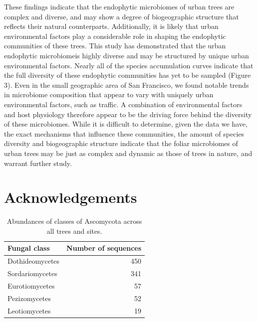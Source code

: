 \documentclass[fleqn,10pt,lineno]{wlpeerj} %
\begin{document}
These findings indicate that the endophytic microbiomes of urban trees are complex and diverse, and may show a degree of biogeographic structure that reflects their natural counterparts. Additionally, it is likely that urban environmental factors play a considerable role in shaping the endophytic communities of these trees. This study has demonstrated that the urban endophytic microbiomeis highly diverse and may be structured by unique urban environmental factors. Nearly all of the species accumulation curves indicate that the full diversity of these endophytic communities has yet to be sampled (Figure 3). Even in the small geographic area of San Francisco, we found notable trends in microbiome composition that appear to vary with uniquely urban environmental factors, such as traffic. A combination of environmental factors and host physiology therefore appear to be the driving force behind the diversity of these microbiomes. While it is difficult to determine, given the data we have, the exact mechanisms that influence these communities, the amount of species diversity and biogeographic structure indicate that the foliar microbiomes of urban trees may be just as complex and dynamic as those of trees in nature, and warrant further study.

\hypertarget{acknowledgements}{%
\section*{Acknowledgements}\label{acknowledgements}}

\begin{table}[!h]

\caption{\label{tab:abund}Abundances of classes of Ascomycota across all trees and sites.}
\centering
\begin{tabular}[t]{lr}
\toprule
Fungal class & Number of sequences\\
\midrule
Dothideomycetes & 450\\
Sordariomycetes & 341\\
Eurotiomycetes & 57\\
Pezizomycetes & 52\\
Leotiomycetes & 19\\
\bottomrule
\end{tabular}
\end{table}
\end{document}
